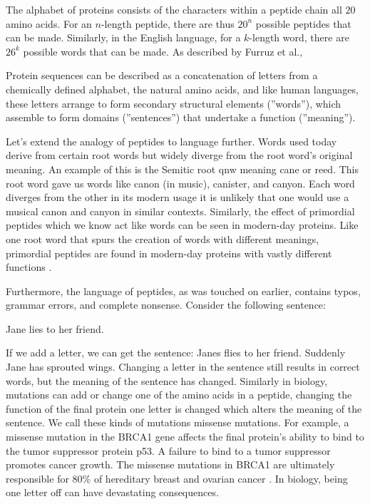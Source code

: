 \documentclass{SBCbookchapter}
\begin{document}
The alphabet of proteins consists of the characters within a peptide chain \textemdash all $20$ amino acids. For an $n$-length peptide, there are thus $20^n$ possible peptides that can be made. 
Similarly, in the English language, for a $k$-length word, there are $26^k$ possible words that can be made. As described by Furruz et al.,

\begin{center}
     Protein sequences can be described as a concatenation of letters from a chemically defined alphabet, the natural amino acids, and like human languages, these letters arrange to form secondary 
structural elements (''words''), which assemble to form domains (''sentences'') that undertake a function (''meaning''). \cite{ferruz_protgpt2_2022}
\end{center}


Let’s extend the analogy of peptides to language further. Words used today derive from certain root words but widely diverge from the root word’s original meaning. An example of this is the Semitic root 
qnw meaning cane or reed. This root word gave us words like canon (in music), canister, and canyon. Each word diverges from the other in its modern usage \textemdash it is unlikely that one would use a 
musical canon and canyon in similar contexts. Similarly, the effect of primordial peptides \textemdash which we know act like words \textemdash can be seen in modern-day proteins. Like one root word 
that spurs the creation of words with different meanings, primordial peptides are found in modern-day proteins with vastly different functions \cite{alva_vocabulary_2015}. 

Furthermore, the language of peptides, as was touched on earlier, contains typos, grammar errors, and complete nonsense. Consider the following sentence:

\begin{center}
    Jane lies to her friend.
\end{center}

If we add a letter, we can get the sentence: Janes flies to her friend. Suddenly Jane has sprouted wings. Changing a letter in the sentence still results in correct words, but the meaning of the 
sentence has changed. Similarly in biology, mutations can add or change one of the amino acids in a peptide, changing the function of the final protein \textemdash one letter is changed which alters the 
meaning of the sentence. We call these kinds of mutations missense mutations. For example, a missense mutation in the BRCA1 gene affects the final protein’s ability to bind to the tumor suppressor 
protein p53. A failure to bind to a tumor suppressor promotes cancer growth. The missense mutations in BRCA1 are ultimately responsible for $80\%$ of hereditary breast and ovarian cancer 
\cite{quaresima_missense_2006}. In biology, being one letter off can have devastating consequences. 
\end{document}
